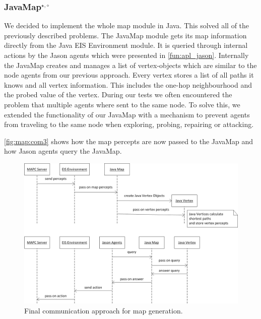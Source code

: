\subsubsection[JavaMap]{JavaMap$^{\star,\circ}$}\label{alg:map_javamap}
We decided to implement the whole map module in Java.
This solved all of the previously described problems.
The JavaMap module gets its map information directly from the Java EIS Environment module.
It is queried through internal actions by the Jason agents which were presented in \autoref{fun:apl_jason}.
Internally the JavaMap creates and manages a list of vertex-objects which are similar to the node agents from our previous approach.
Every vertex stores a list of all paths it knows and all vertex information.
This includes the one-hop neighbourhood and the probed value of the vertex.
During our tests we often encountered the problem that multiple agents where sent to the same node.
To solve this, we extended the functionality of our JavaMap with a mechanism to prevent agents from traveling to the same node when exploring, probing, repairing or attacking.

\autoref{fig:map:com3} shows how the map percepts are now passed to the JavaMap and how Jason agents query the JavaMap.
\begin{figure}
  \centering
  \includegraphics[width=\linewidth]{images/map_com_3.png}
  \caption{Final communication approach for map generation.}
  \label{fig:map:com3}
\end{figure}

